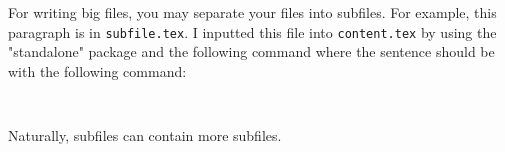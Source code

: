 \documentclass{article}
\title{     }
\author{     }
\date{     }
\begin{document}
For writing big files, you may separate your files into subfiles. For example, this paragraph is in \texttt{subfile.tex}. I inputted this file into \texttt{content.tex} by using the "standalone" package and the following command where the sentence should be with the following command:
\begin{verbatim}
 
\end{verbatim} 
Naturally, subfiles can contain more subfiles.
\end{document}
